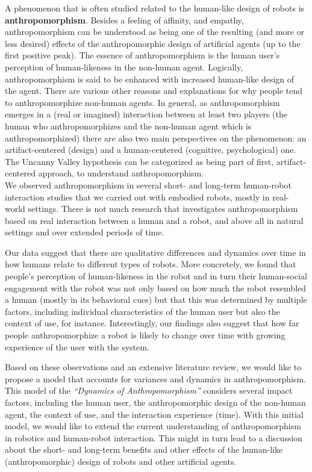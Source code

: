 \documentclass{frontiersSCNS} %
\begin{document}
A phenomenon that is often studied related to the human-like design of robots is
\textbf{anthropomorphism}. Besides a feeling of affinity, and empathy,
anthropomorphism can be understood as being one of the resulting (and  more or
less desired) effects of the anthropomorphic design of artificial agents (up to
the first positive peak). The essence of anthropomorphism is the human user's
perception of human-likeness in the non-human agent. Logically, anthropomorphism
is said to be enhanced with increased human-like design of the agent. There are
various other reasons and explanations for why people tend to anthropomorphize
non-human agents. In general, as anthropomorphism emerges in a (real or
imagined) interaction \citep{persson_anthropomorphism_2000} between at least two
players (the human who anthropomorphizes and the non-human agent which is
anthropomorphized) there are also two main perspectives on the phenomenon: an
artifact-centered (design) and a human-centered (cognitive, psychological) one.
The Uncanny Valley hypothesis can be categorized as being part of first,
artifact-centered approach, to understand anthropomorphism.\\

We observed anthropomorphism in several short- and long-term human-robot
interaction studies that we carried out with embodied robots, mostly in
real-world settings. There is not much research that investigates
anthropomorphism based on real interaction between a human and a robot, and
above all in natural settings and over extended periods of time. 

Our data suggest that there are qualitative differences and dynamics over time
in how humans relate to different types of robots. More concretely, we found
that people's perception of human-likeness in the robot and in turn their
human-social engagement with the robot was not only based on how much the robot
resembled a human (mostly in its behavioral cues) but that this was determined
by multiple factors, including individual characteristics of the human user but
also the context of use, for instance. Interestingly, our findings also suggest
that how far people anthropomorphize a robot is likely to change over time with
growing experience of the user with the system. 

Based on these observations and an extensive literature review, we would like to
propose a model that accounts for variances and dynamics in anthropomorphism.
This model of the \textit{``Dynamics of Anthropomorphism''} considers several
impact factors, including the human user, the anthropomorphic design of the
non-human agent, the context of use, and the interaction experience (time). With
this initial model, we would like to extend the current understanding of
anthropomorphism in robotics and human-robot interaction. This might in turn
lead to a discussion about the short- and long-term benefits and other effects
of the human-like (anthropomorphic) design of robots and other artificial
agents.\\
\end{document}
